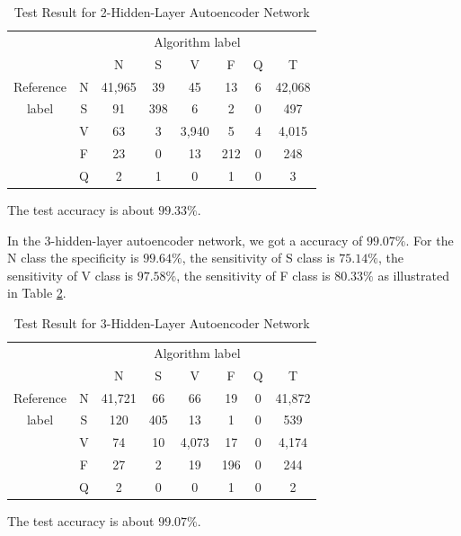 \documentclass[journal]{IEEEtran}
\begin{document}
\begin{table}[!htbp]
\begin{center}
\begin{threeparttable}
\caption{Test Result for 2-Hidden-Layer Autoencoder Network}
\label{table5}
\begin{tabular}{cccccccc}
\hline
\multicolumn{6}{r}{Algorithm label} \\
\cline{3-7}
&  & N & S & V & F & Q & T\\
\hline
 Reference & N & 41,965 &  39  &  45  & 13  &  6  &  42,068 \\
	label & S &  91   & 398  &  6   & 2   & 0   &  497\\
			      & V &  63   & 3    & 3,940 & 5   & 4   &  4,015\\
			      & F &  23   & 0    & 13   & 212 & 0   &  248\\
			      & Q & 2     & 1    & 0    & 1   & 0   &  3\\
\hline
\end{tabular}
\begin{tablenotes}
\item The test accuracy is about $99.33\%$.
\end{tablenotes}
\end{threeparttable}
\end{center}
\end{table}

In the 3-hidden-layer autoencoder network, we got a accuracy of $99.07\%$. For the N class the specificity is $99.64\%$, the sensitivity of S class is $75.14\%$, the sensitivity of V class is $97.58\%$, the sensitivity of F class is $80.33\%$ as illustrated in Table \ref{table6}. 

\begin{table}[!htbp]
\begin{center}
\begin{threeparttable}
\caption{Test Result for 3-Hidden-Layer Autoencoder Network}
\label{table6}
\begin{tabular}{cccccccc}
\hline
\multicolumn{6}{r}{Algorithm label} \\
\cline{3-7}
&  & N & S & V & F & Q & T\\
\hline
 Reference & N & 41,721 &  66  &  66  & 19  &  0 &  41,872 \\
	label & S &  120  & 405  &  13  & 1   & 0  &  539\\
			   & V &  74   & 10   & 4,073 & 17  & 0  &  4,174\\
			   & F &  27   & 2    & 19   & 196 & 0  &  244\\
			   & Q & 2     & 0    & 0    & 1   & 0  &  2\\
\hline
\end{tabular}
\begin{tablenotes}
\item The test accuracy is about $99.07\%$.
\end{tablenotes}
\end{threeparttable}
\end{center}
\end{table}
\end{document}
